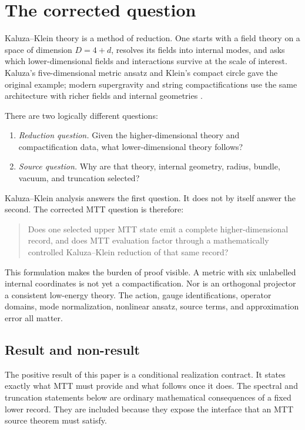 \documentclass[11pt]{article}
\theoremstyle{definition}
\theoremstyle{remark}
\let\MTToriginalitem\item
\renewcommand{\item}{\par\MTToriginalitem}
\begin{document}
\tableofcontents

\section{The corrected question}
\label{sec:question}

Kaluza--Klein theory is a method of reduction.  One starts with a field
theory on a space of dimension \(D=4+d\), resolves its fields into internal
modes, and asks which lower-dimensional fields and interactions survive at
the scale of interest.  Kaluza's five-dimensional metric ansatz and Klein's
compact circle gave the original example; modern supergravity and string
compactifications use the same architecture with richer fields and internal
geometries
\cite{Kaluza1921,Klein1926,DuffNilssonPope1986,Witten1981}.

There are two logically different questions:
\begin{enumerate}[leftmargin=2em]
\item \emph{Reduction question.}  Given the higher-dimensional theory and
      compactification data, what lower-dimensional theory follows?
\item \emph{Source question.}  Why are that theory, internal geometry,
      radius, bundle, vacuum, and truncation selected?
\end{enumerate}
Kaluza--Klein analysis answers the first question.  It does not by itself
answer the second.  The corrected MTT question is therefore:
\begin{quote}
Does one selected upper MTT state emit a complete higher-dimensional record,
and does MTT evaluation factor through a mathematically controlled
Kaluza--Klein reduction of that same record?
\end{quote}

This formulation makes the burden of proof visible.  A metric with six
unlabelled internal coordinates is not yet a compactification.  Nor is an
orthogonal projector a consistent low-energy theory.  The action, gauge
identifications, operator domains, mode normalization, nonlinear ansatz,
source terms, and approximation error all matter.

\subsection{Result and non-result}

The positive result of this paper is a conditional realization contract.  It
states exactly what MTT must provide and what follows once it does.  The
spectral and truncation statements below are ordinary mathematical
consequences of a fixed lower record.  They are included because they expose
the interface that an MTT source theorem must satisfy.
\end{document}
